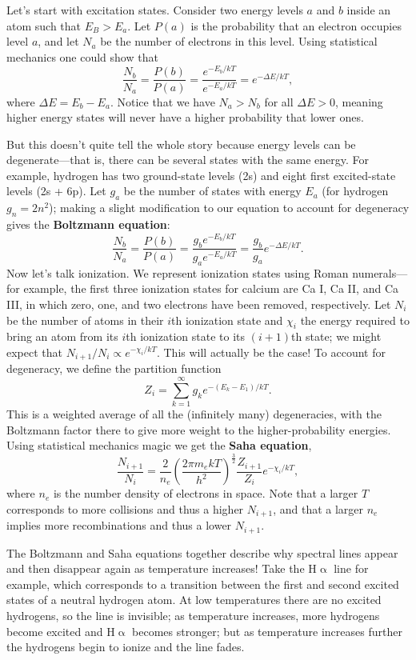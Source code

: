 \documentclass[../a062main.tex]{subfiles}
\begin{document}
Let's start with excitation states.
Consider two energy levels $a$ and $b$ inside an atom such that $E_B > E_a$.
Let $P(a)$ is the probability that an electron occupies level $a$, and let $N_a$ be the number of electrons in this level.
Using statistical mechanics one could show that
\[ \frac{N_b}{N_a} = \frac{P(b)}{P(a)} = \frac{e^{-E_b / kT}}{e^{-E_a / kT}} = e^{-\Delta E / kT}, \]
where $\Delta E = E_b - E_a$.
Notice that we have $N_a > N_b$ for all $\Delta E > 0$, meaning higher energy states will never have a higher probability that lower ones.

But this doesn't quite tell the whole story because energy levels can be degenerate---that is, there can be several states with the same energy.
For example, hydrogen has two ground-state levels (2s) and eight first excited-state levels (2s + 6p).
Let $g_a$ be the number of states with energy $E_a$ (for hydrogen $g_n = 2n^2$); making a slight modification to our equation to account for degeneracy gives the \textbf{Boltzmann equation}:
\[ \boxed{\frac{N_b}{N_a} = \frac{P(b)}{P(a)} = \frac{g_b e^{-E_b / kT}}{g_a e^{-E_a / kT}} = \frac{g_b}{g_a} e^{-\Delta E / kT}}. \]
Now let's talk ionization.
We represent ionization states using Roman numerals---for example, the first three ionization states for calcium are Ca I, Ca II, and Ca III, in which zero, one, and two electrons have been removed, respectively.
Let $N_i$ be the number of atoms in their $i$th ionization state and $\chi_i$ the energy required to bring an atom from its $i$th ionization state to its $(i+1)$th state; we might expect that $N_{i+1} / N_i \propto e^{-\chi_i / kT}$.
This will actually be the case!
To account for degeneracy, we define the partition function
\[ Z_i = \sum_{k=1}^{\infty} g_k e^{-(E_k - E_1) / kT}. \]
This is a weighted average of all the (infinitely many) degeneracies, with the Boltzmann factor there to give more weight to the higher-probability energies.
Using statistical mechanics magic we get the \textbf{Saha equation},
\[ \boxed{\frac{N_{i+1}}{N_i} = \frac{2}{n_e} \left( \frac{2\pi m_e kT}{h^2} \right)^{\frac{3}{2}} \frac{Z_{i+1}}{Z_i} e^{-\chi_i / kT}}, \]
where $n_e$ is the number density of electrons in space.
Note that a larger $T$ corresponds to more collisions and thus a higher $N_{i+1}$, and that a larger $n_e$ implies more recombinations and thus a lower $N_{i+1}$. %

The Boltzmann and Saha equations together describe why spectral lines appear and then disappear again as temperature increases!
Take the H$\upalpha$ line for example, which corresponds to a transition between the first and second excited states of a neutral hydrogen atom.
At low temperatures there are no excited hydrogens, so the line is invisible; as temperature increases, more hydrogens become excited and H$\upalpha$ becomes stronger; but as temperature increases further the hydrogens begin to ionize and the line fades.
\end{document}
